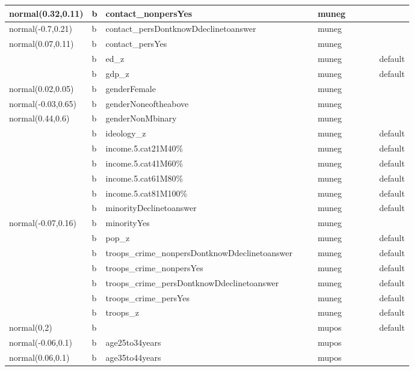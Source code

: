 \documentclass[
]{book}
\theoremstyle{definition}
\theoremstyle{definition}
\theoremstyle{definition}
\theoremstyle{definition}
\theoremstyle{remark}
\begin{document}
\begin{table}
\begin{tabular}[t]{l|l|l|l|l|l|l|l|l|l}
\hline
normal(0.32,0.11) & b & contact\_nonpersYes &  &  & muneg &  &  &  & \\
\hline
normal(-0.7,0.21) & b & contact\_persDontknowDdeclinetoanswer &  &  & muneg &  &  &  & \\
\hline
normal(0.07,0.11) & b & contact\_persYes &  &  & muneg &  &  &  & \\
\hline
 & b & ed\_z &  &  & muneg &  &  &  & default\\
\hline
 & b & gdp\_z &  &  & muneg &  &  &  & default\\
\hline
normal(0.02,0.05) & b & genderFemale &  &  & muneg &  &  &  & \\
\hline
normal(-0.03,0.65) & b & genderNoneoftheabove &  &  & muneg &  &  &  & \\
\hline
normal(0.44,0.6) & b & genderNonMbinary &  &  & muneg &  &  &  & \\
\hline
 & b & ideology\_z &  &  & muneg &  &  &  & default\\
\hline
 & b & income.5.cat21M40\% &  &  & muneg &  &  &  & default\\
\hline
 & b & income.5.cat41M60\% &  &  & muneg &  &  &  & default\\
\hline
 & b & income.5.cat61M80\% &  &  & muneg &  &  &  & default\\
\hline
 & b & income.5.cat81M100\% &  &  & muneg &  &  &  & default\\
\hline
 & b & minorityDeclinetoanswer &  &  & muneg &  &  &  & default\\
\hline
normal(-0.07,0.16) & b & minorityYes &  &  & muneg &  &  &  & \\
\hline
 & b & pop\_z &  &  & muneg &  &  &  & default\\
\hline
 & b & troops\_crime\_nonpersDontknowDdeclinetoanswer &  &  & muneg &  &  &  & default\\
\hline
 & b & troops\_crime\_nonpersYes &  &  & muneg &  &  &  & default\\
\hline
 & b & troops\_crime\_persDontknowDdeclinetoanswer &  &  & muneg &  &  &  & default\\
\hline
 & b & troops\_crime\_persYes &  &  & muneg &  &  &  & default\\
\hline
 & b & troops\_z &  &  & muneg &  &  &  & default\\
\hline
normal(0,2) & b &  &  &  & mupos &  &  &  & default\\
\hline
normal(-0.06,0.1) & b & age25to34years &  &  & mupos &  &  &  & \\
\hline
normal(0.06,0.1) & b & age35to44years &  &  & mupos &  &  &  & \\

\end{tabular}
\end{table}
\end{document}
